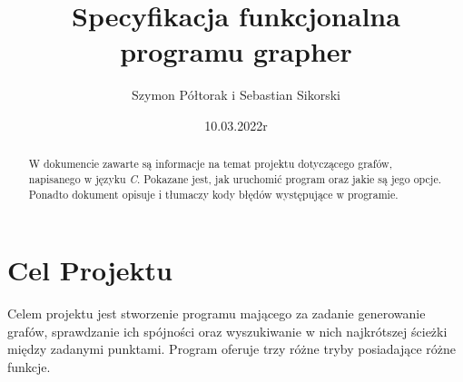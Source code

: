 \documentclass[10pt, a4paper]{report}
\title{\huge{\textbf{Specyfikacja funkcjonalna}}\\ programu grapher}
\author{Szymon Półtorak i Sebastian Sikorski}
\date{10.03.2022r}
\begin{document}
\maketitle

\renewcommand*\thesection{\arabic{section}} 

\begin{abstract}
W dokumencie zawarte są informacje na temat projektu dotyczącego grafów, napisanego w języku \textit{C}.
Pokazane jest, jak uruchomić program oraz jakie są jego opcje. 
Ponadto dokument opisuje i tłumaczy kody błędów występujące w programie.
\end{abstract}

\pagestyle{fancy}
\fancyhf{}

\tableofcontents
\newpage

\section{Cel Projektu}
Celem projektu jest stworzenie programu mającego za zadanie generowanie grafów, sprawdzanie ich spójności oraz wyszukiwanie w nich najkrótszej ścieżki między zadanymi punktami. 
Program oferuje trzy różne tryby posiadające różne funkcje.
\end{document}
